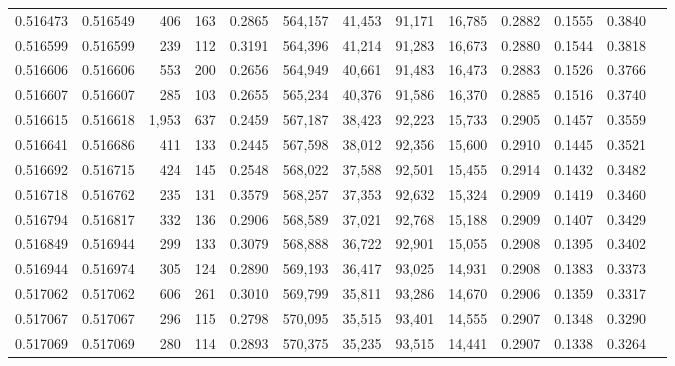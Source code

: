 \begin{tabular}{rrrrrrrrrrrrr}
0.516473 & 0.516549 &   406 &   163 &                                     0.2865 & 564,157 &  41,453 &  91,171 &  16,785 & 0.2882 & 0.1555 & 0.3840 \\
0.516599 & 0.516599 &   239 &   112 &                                     0.3191 & 564,396 &  41,214 &  91,283 &  16,673 & 0.2880 & 0.1544 & 0.3818 \\
0.516606 & 0.516606 &   553 &   200 &                                     0.2656 & 564,949 &  40,661 &  91,483 &  16,473 & 0.2883 & 0.1526 & 0.3766 \\
0.516607 & 0.516607 &   285 &   103 &                                     0.2655 & 565,234 &  40,376 &  91,586 &  16,370 & 0.2885 & 0.1516 & 0.3740 \\
0.516615 & 0.516618 & 1,953 &   637 &                                     0.2459 & 567,187 &  38,423 &  92,223 &  15,733 & 0.2905 & 0.1457 & 0.3559 \\
0.516641 & 0.516686 &   411 &   133 &                                     0.2445 & 567,598 &  38,012 &  92,356 &  15,600 & 0.2910 & 0.1445 & 0.3521 \\
0.516692 & 0.516715 &   424 &   145 &                                     0.2548 & 568,022 &  37,588 &  92,501 &  15,455 & 0.2914 & 0.1432 & 0.3482 \\
0.516718 & 0.516762 &   235 &   131 &                                     0.3579 & 568,257 &  37,353 &  92,632 &  15,324 & 0.2909 & 0.1419 & 0.3460 \\
0.516794 & 0.516817 &   332 &   136 &                                     0.2906 & 568,589 &  37,021 &  92,768 &  15,188 & 0.2909 & 0.1407 & 0.3429 \\
0.516849 & 0.516944 &   299 &   133 &                                     0.3079 & 568,888 &  36,722 &  92,901 &  15,055 & 0.2908 & 0.1395 & 0.3402 \\
0.516944 & 0.516974 &   305 &   124 &                                     0.2890 & 569,193 &  36,417 &  93,025 &  14,931 & 0.2908 & 0.1383 & 0.3373 \\
0.517062 & 0.517062 &   606 &   261 &                                     0.3010 & 569,799 &  35,811 &  93,286 &  14,670 & 0.2906 & 0.1359 & 0.3317 \\
0.517067 & 0.517067 &   296 &   115 &                                     0.2798 & 570,095 &  35,515 &  93,401 &  14,555 & 0.2907 & 0.1348 & 0.3290 \\
0.517069 & 0.517069 &   280 &   114 &                                     0.2893 & 570,375 &  35,235 &  93,515 &  14,441 & 0.2907 & 0.1338 & 0.3264 \\

\end{tabular}
